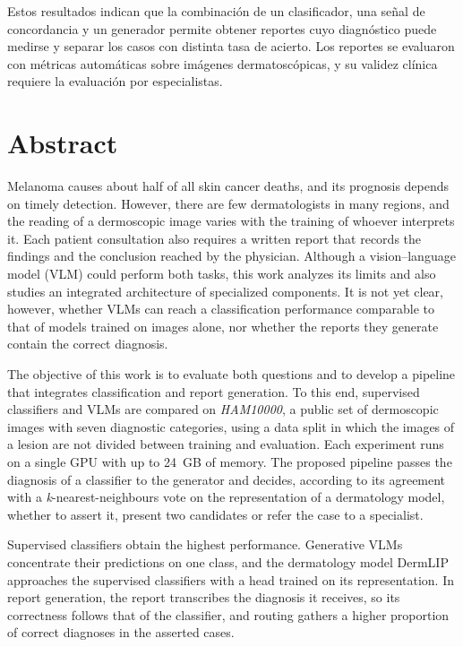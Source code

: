 Estos resultados indican que la combinación de un clasificador, una señal de concordancia y un generador permite
obtener reportes cuyo diagnóstico puede medirse y separar los casos con distinta tasa de acierto. Los reportes se
evaluaron con métricas automáticas sobre imágenes dermatoscópicas, y su validez clínica requiere la evaluación por especialistas.


\chapter*{Abstract}

Melanoma causes about half of all skin cancer deaths, and its prognosis depends on timely detection. However, there
are few dermatologists in many regions, and the reading of a dermoscopic image varies with the training of whoever
interprets it. Each patient consultation also requires a written report that records the findings and the conclusion
reached by the physician. Although a vision--language model (VLM) could perform both tasks, this work analyzes its limits and also studies an integrated architecture of specialized components. It is not yet clear, however, whether VLMs can reach a classification performance comparable to that of models
trained on images alone, nor whether the reports they generate contain the correct diagnosis.

The objective of this work is to evaluate both questions and to develop a pipeline that integrates classification and
report generation. To this end, supervised classifiers and VLMs are compared on \emph{HAM10000}, a public set of
dermoscopic images with seven diagnostic categories, using a data split in which the images of a lesion are not divided
between training and evaluation. Each experiment runs on a single GPU with up to 24~GB of memory. The proposed pipeline
passes the diagnosis of a classifier to the generator and decides, according to its agreement with a
\emph{k}-nearest-neighbours vote on the representation of a dermatology model, whether to assert it, present two
candidates or refer the case to a specialist.

Supervised classifiers obtain the highest performance. Generative VLMs concentrate their predictions on one class, and
the dermatology model DermLIP approaches the supervised classifiers with a head trained on its representation. In
report generation, the report transcribes the diagnosis it receives, so its correctness follows that of the classifier,
and routing gathers a higher proportion of correct diagnoses in the asserted cases.

